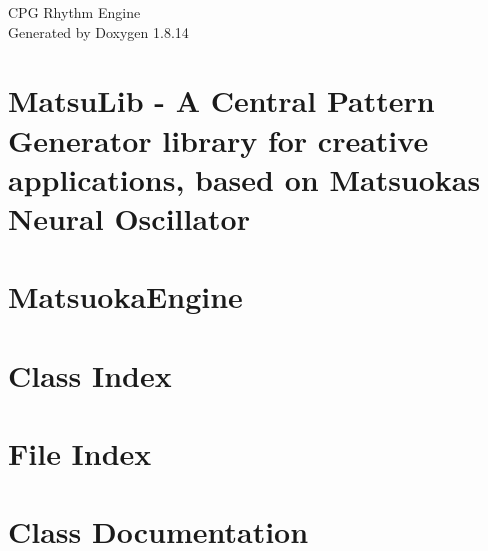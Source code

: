 \documentclass[twoside]{book}
\newcommand{\+}{\discretionary{\mbox{\scriptsize$\hookleftarrow$}}{}{}}
\newcommand{\clearemptydoublepage}{%
  \newpage{\pagestyle{empty}\cleardoublepage}%
}
\begin{document}
\hypersetup{pageanchor=false,
             bookmarksnumbered=true,
             pdfencoding=unicode
            }
\begin{titlepage}
\vspace*{7cm}
\begin{center}%
{\Large C\+PG Rhythm Engine }\\
\vspace*{1cm}
{\large Generated by Doxygen 1.8.14}\\
\end{center}
\end{titlepage}
\clearemptydoublepage
{}
\tableofcontents
\clearemptydoublepage
{}
\hypersetup{pageanchor=true}

\chapter{Matsu\+Lib -\/ A Central Pattern Generator library for creative applications, based on Matsuoka\textquotesingle{}s Neural Oscillator}
\label{index}\hypertarget{index}{}
\chapter{Matsuoka\+Engine}
\label{md_O_1_Documents_Max_7_Packages_max_cpg_source_MatsuokaEngine_src_ReadMe}

\chapter{Class Index}

\chapter{File Index}

\chapter{Class Documentation}
















\end{document}

